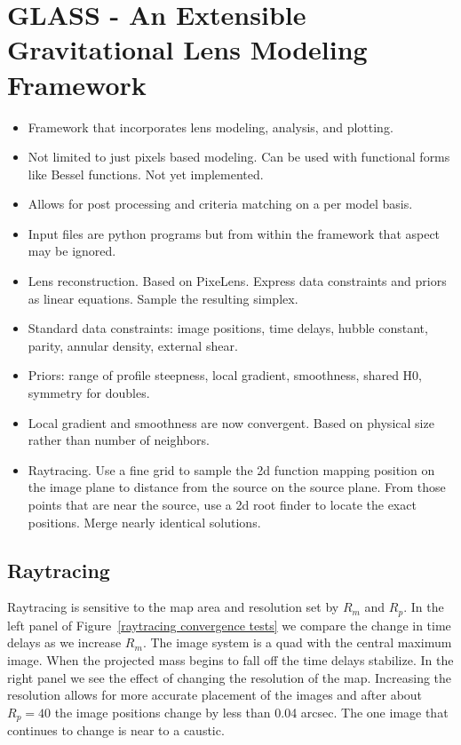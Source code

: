 \documentclass[onecolumn,galley]{mn2e}
\newcommand{\figref}[1] {Figure~\ref{#1}}
\newcommand{\Rmap}{\ensuremath{R_m}}
\newcommand{\Rpix}{\ensuremath{R_p}}
\begin{document}
\section{GLASS - An Extensible Gravitational Lens Modeling Framework}
\label{GLASS Description}
\begin{itemize} 
\item Framework that incorporates lens modeling, analysis, and plotting.
\item Not limited to just pixels based modeling. Can be used with functional forms like Bessel functions. Not yet implemented.
\item Allows for post processing and criteria matching on a per model basis.
\item Input files are python programs but from within the framework that aspect may be ignored.

\item Lens reconstruction. Based on PixeLens. Express data constraints and
priors as linear equations. Sample the resulting simplex.
\item Standard data constraints: image positions, time delays, hubble constant, parity, annular density, external shear.
\item Priors: range of profile steepness, local gradient, smoothness, shared H0, symmetry for doubles.
\item Local gradient and smoothness are now convergent. Based on physical size rather than number of neighbors.

\item Raytracing. Use a fine grid to sample the 2d function mapping position on
the image plane to distance from the source on the source plane. From those
points that are near the source, use a 2d root finder to locate the exact
positions. Merge nearly identical solutions.

\end{itemize}

\subsection{Raytracing}
Raytracing is sensitive to the map area and resolution set by $\Rmap$ and
$\Rpix$.  In the left panel of \figref{raytracing convergence tests} we compare
the change in time delays as we increase $\Rmap$.  The image system is a quad
with the central maximum image. When the projected mass begins to fall off the
time delays stabilize. In the right panel we see the effect of changing the
resolution of the map.  Increasing the resolution allows for more accurate
placement of the images and after about $\Rpix=40$ the image positions change
by less than 0.04 arcsec. The one image that continues to change is near to a
caustic.  
\end{document}
